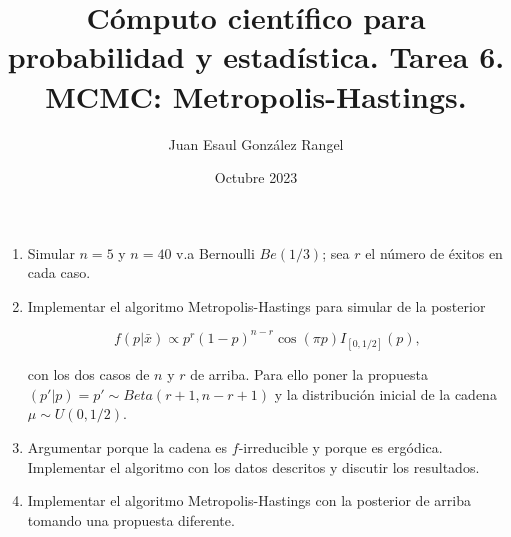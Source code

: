 \documentclass{article}
\title{Cómputo científico para probabilidad y estadística. Tarea 6.\\
MCMC: Metropolis-Hastings.}
\author{Juan Esaul González Rangel}
\date{Octubre 2023}
\begin{document}
\maketitle


\begin{enumerate}

    \item  Simular $n = 5$ y $n = 40$ v.a Bernoulli $Be(1/3)$; sea $r$ el número de
éxitos en cada caso.

    \item Implementar el algoritmo Metropolis-Hastings para simular de la posterior
    
    \[f (p|\bar{x}) \propto p^r(1 - p)^{n-r} \cos(\pi p)I_{[0, 1/2 ]}(p),\]

con los dos casos de $n$ y $r$ de arriba. Para ello poner la propuesta $(p'|p) = p' \sim Beta(r + 1, n - r + 1)$ y la distribución inicial de la cadena $\mu \sim U (0, 1/2 )$.

    \item Argumentar porque la cadena es $f$-irreducible y porque es ergódica. Implementar el algoritmo con los datos descritos y discutir los resultados.

    \item  Implementar el algoritmo Metropolis-Hastings con la posterior de arriba
tomando una propuesta diferente.
   
\end{enumerate}




 
\end{document}
